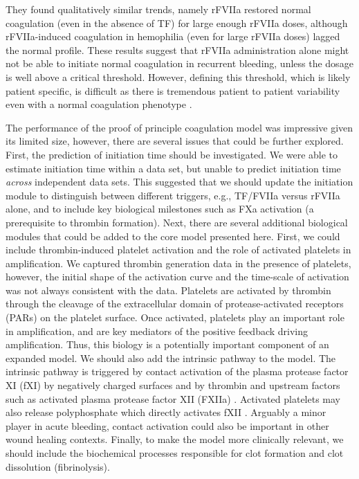 \documentclass[processes,article,received,moreauthors,pdftex,12pt,a4paper]{mdpi}
\begin{document}
They found qualitatively similar trends, namely rFVIIa restored normal coagulation (even in the absence of TF) for large enough rFVIIa doses, although rFVIIa-induced coagulation 
in hemophilia (even for large rFVIIa doses) lagged the normal profile. 
These results suggest that rFVIIa administration alone
might not be able to initiate normal coagulation in recurrent bleeding, unless the dosage is well above a critical threshold.
However, defining this threshold, which is likely patient specific, is difficult as there is tremendous patient to patient variability even with a normal
coagulation phenotype \citep{Danforth:2012aa}. 

The performance of the proof of principle coagulation model was impressive given its limited size, however, there are several issues that could be further explored.
First, the prediction of initiation time should be investigated. 
We were able to estimate initiation time within a data set, but unable to predict initiation time \textit{across} independent data sets. 
This suggested that we should update the initiation module to distinguish between different triggers, e.g., TF/FVIIa versus rFVIIa alone, 
and to include key biological milestones such as FXa activation (a prerequisite to thrombin formation).
Next, there are several additional biological modules that could be added to the core model presented here. 
First, we could include thrombin-induced platelet activation and the role of activated platelets in amplification.
We captured thrombin generation data in the presence of platelets, however,
the initial shape of the activation curve and the time-scale of activation was not always consistent with the data.
Platelets are activated by thrombin through the cleavage of the extracellular domain of protease-activated receptors (PARs) on the platelet surface.
Once activated, platelets play an important role in amplification, and are key mediators of the positive feedback driving amplification.
Thus, this biology is a potentially important component of an expanded model.
We should also add the intrinsic pathway to the model. 
The intrinsic pathway is triggered by contact activation of the plasma protease factor XI (fXI) by negatively charged surfaces and by thrombin and upstream factors such as activated
plasma protease factor XII (FXIIa) \citep{NAITO1991,Gailani:1991aa}.
Activated platelets may also release polyphosphate which directly activates fXII \cite{Smith:2006zl}. 
Arguably a minor player in acute bleeding, contact activation could also be important in other wound healing contexts. 
Finally, to make the model more clinically relevant, we should include the biochemical processes responsible for clot formation and clot dissolution (fibrinolysis).
\end{document}
